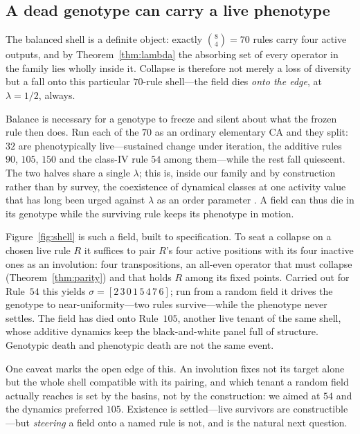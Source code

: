 \documentclass[man,12pt,floatsintext]{apa7}
\newcommand{\sig}{\sigma}
\begin{document}
\subsection{A dead genotype can carry a live phenotype}
\label{sec:shell}

The balanced shell is a definite object: exactly $\binom{8}{4} = 70$ rules
carry four active outputs, and by Theorem~\ref{thm:lambda} the absorbing set of
every operator in the family lies wholly inside it. Collapse is therefore not
merely a loss of diversity but a fall onto this particular $70$-rule shell---the
field dies \emph{onto the edge}, at $\lambda = 1/2$, always.

Balance is necessary for a genotype to freeze and silent about what the frozen
rule then does. Run each of the $70$ as an ordinary elementary CA and they
split: $32$ are phenotypically live---sustained change under iteration, the
additive rules $90$, $105$, $150$ and the class-IV rule $54$ among them---while
the rest fall quiescent. The two halves share a single $\lambda$; this is,
inside our family and by construction rather than by survey, the coexistence of
dynamical classes at one activity value that has long been urged against
$\lambda$ as an order parameter \parencite{sakai2002edge}. A field can thus die
in its genotype while the surviving rule keeps its phenotype in motion.

Figure~\ref{fig:shell} is such a field, built to specification. To seat a
collapse on a chosen live rule $R$ it suffices to pair $R$'s four active
positions with its four inactive ones as an involution: four transpositions, an
all-even operator that must collapse (Theorem~\ref{thm:parity}) and that holds
$R$ among its fixed points. Carried out for Rule~$54$ this yields
$\sig = [2\,3\,0\,1\,5\,4\,7\,6]$; run from a random field it drives the
genotype to near-uniformity---two rules survive---while the phenotype never
settles. The field has died onto Rule~$105$, another live tenant of the same
shell, whose additive dynamics keep the black-and-white panel full of
structure. Genotypic death and phenotypic death are not the same event.

One caveat marks the open edge of this. An involution fixes not its target
alone but the whole shell compatible with its pairing, and which tenant a
random field actually reaches is set by the basins, not by the construction: we
aimed at $54$ and the dynamics preferred $105$. Existence is settled---live
survivors are constructible---but \emph{steering} a field onto a named rule is
not, and is the natural next question.
\end{document}
